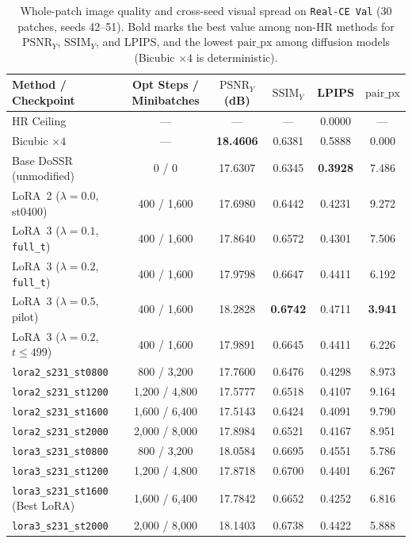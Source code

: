 \documentclass[11pt]{article}
\begin{document}
\begin{table}[ht]
\centering
\footnotesize
\caption{Whole-patch image quality and cross-seed visual spread on \texttt{Real-CE Val} (30 patches, seeds 42--51). Bold marks the best value among non-HR methods for $\text{PSNR}_Y$, $\text{SSIM}_Y$, and LPIPS, and the lowest $\text{pair\_px}$ among diffusion models (Bicubic $\times 4$ is deterministic).}
\label{tab:master_val}
\begin{tabular}{lccccc}
\toprule
Method / Checkpoint & Opt Steps / Minibatches & $\text{PSNR}_Y$ (dB) & $\text{SSIM}_Y$ & LPIPS & $\text{pair\_px}$ \\
\midrule
HR Ceiling & --- & --- & --- & 0.0000 & --- \\
Bicubic $\times 4$ & --- & \textbf{18.4606} & 0.6381 & 0.5888 & 0.000 \\
Base DoSSR (unmodified) & 0 / 0 & 17.6307 & 0.6345 & \textbf{0.3928} & 7.486 \\
\midrule
LoRA~2 ($\lambda=0.0$, st0400) & 400 / 1,600 & 17.6980 & 0.6442 & 0.4231 & 9.272 \\
LoRA~3 ($\lambda=0.1$, \texttt{full\_t}) & 400 / 1,600 & 17.8640 & 0.6572 & 0.4301 & 7.506 \\
LoRA~3 ($\lambda=0.2$, \texttt{full\_t}) & 400 / 1,600 & 17.9798 & 0.6647 & 0.4411 & 6.192 \\
LoRA~3 ($\lambda=0.5$, pilot) & 400 / 1,600 & 18.2828 & \textbf{0.6742} & 0.4711 & \textbf{3.941} \\
LoRA~3 ($\lambda=0.2$, $t\le 499$) & 400 / 1,600 & 17.9891 & 0.6645 & 0.4411 & 6.226 \\
\midrule
\texttt{lora2\_s231\_st0800} & 800 / 3,200 & 17.7600 & 0.6476 & 0.4298 & 8.973 \\
\texttt{lora2\_s231\_st1200} & 1,200 / 4,800 & 17.5777 & 0.6518 & 0.4107 & 9.164 \\
\texttt{lora2\_s231\_st1600} & 1,600 / 6,400 & 17.5143 & 0.6424 & 0.4091 & 9.790 \\
\texttt{lora2\_s231\_st2000} & 2,000 / 8,000 & 17.8984 & 0.6521 & 0.4167 & 8.951 \\
\midrule
\texttt{lora3\_s231\_st0800} & 800 / 3,200 & 18.0584 & 0.6695 & 0.4551 & 5.786 \\
\texttt{lora3\_s231\_st1200} & 1,200 / 4,800 & 17.8718 & 0.6700 & 0.4401 & 6.267 \\
\texttt{lora3\_s231\_st1600} (Best LoRA) & 1,600 / 6,400 & 17.7842 & 0.6652 & 0.4252 & 6.816 \\
\texttt{lora3\_s231\_st2000} & 2,000 / 8,000 & 18.1403 & 0.6738 & 0.4422 & 5.888 \\
\bottomrule
\end{tabular}
\end{table}
\end{document}
